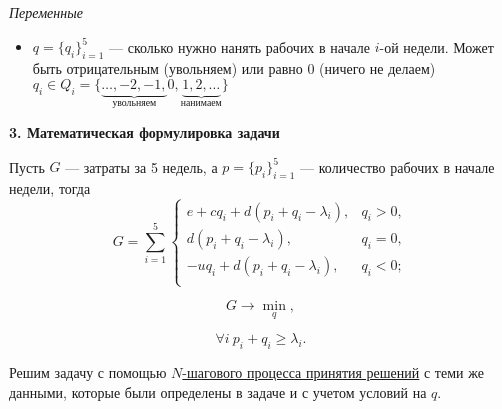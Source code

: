 \bigskip

\textit{Переменные}

\begin{itemize}[nosep]	
	\item $q = \{q_i\}_{i=1}^5$ --- сколько нужно нанять рабочих в начале $i$-ой недели. Может быть отрицательным (увольняем) или равно 0 (ничего не делаем) $q_i \in Q_i = \{\underbrace{\dots, -2, -1,}_{\text{увольняем}} 0, \underbrace{1, 2, \dots}_{\text{нанимаем}}\}$
\end{itemize}

\bigskip

\textbf{3. Математическая формулировка задачи}

Пусть $G$ --- затраты за 5 недель, а $p = \{p_i\}_{i=1}^5$ --- количество рабочих в начале недели, тогда
\[G = \sum_{i=1}^{5}  \begin{cases}
	e + cq_i + d(p_i + q_i - \lambda_i),& q_i > 0, \\
	d(p_i + q_i - \lambda_i),& q_i = 0, \\
	-uq_i + d(p_i + q_i - \lambda_i),& q_i < 0; \\
\end{cases}\]

\[G \to \min_{q},\]

\[\forall  i \ p_i + q_i \ge \lambda_i. \tag{*}\]

\solution

Решим задачу с помощью \hyperref[alg:n_step_process]{$N$-шагового процесса принятия решений} с теми же данными, которые были определены в задаче и с учетом условий на $q$.

\bigskip

